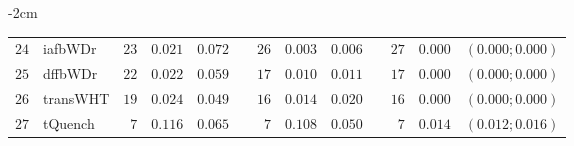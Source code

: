 \begin{table*}[!htbp]
\begin{adjustwidth*}{}{-2cm}
\begin{tabular}{@{}rlrrrrrrrrrcc@{}}
\footnotesize{$24$} & \footnotesize{iafbWDr  } & \footnotesize{$23$} & \footnotesize{$0.021$} & \footnotesize{$0.072$} && \footnotesize{$26$} & \footnotesize{$0.003$} & \footnotesize{$0.006$} && \footnotesize{$27$} & \footnotesize{$0.000$} & \footnotesize{$(0.000;0.000)$} \\
\footnotesize{$25$} & \footnotesize{dffbWDr  } & \footnotesize{$22$} & \footnotesize{$0.022$} & \footnotesize{$0.059$} && \footnotesize{$17$} & \footnotesize{$0.010$} & \footnotesize{$0.011$} && \footnotesize{$17$} & \footnotesize{$0.000$} & \footnotesize{$(0.000;0.000)$} \\
\footnotesize{$26$} & \footnotesize{transWHT } & \footnotesize{$19$} & \footnotesize{$0.024$} & \footnotesize{$0.049$} && \footnotesize{$16$} & \footnotesize{$0.014$} & \footnotesize{$0.020$} && \footnotesize{$16$} & \footnotesize{$0.000$} & \footnotesize{$(0.000;0.000)$} \\
\footnotesize{$27$} & \footnotesize{tQuench  } & \footnotesize{$7 $} & \footnotesize{$0.116$} & \footnotesize{$0.065$} && \footnotesize{$7 $} & \footnotesize{$0.108$} & \footnotesize{$0.050$} && \footnotesize{$7 $} & \footnotesize{$0.014$} & \footnotesize{$(0.012;0.016)$} \\
\bottomrule
\end{tabular}
\end{adjustwidth*}
\end{table*}

